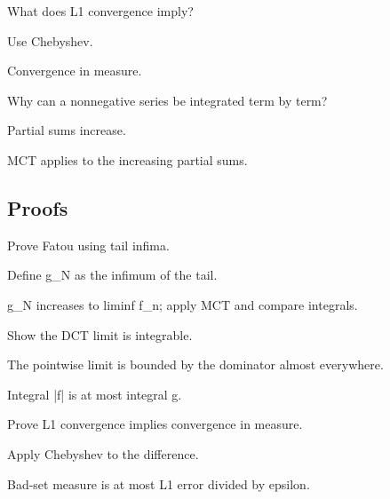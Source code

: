 \begin{exercise}[L1 to measure]\label{exr:iii04-expand-04}
What does L1 convergence imply?
\end{exercise}
\begin{hint}
Use Chebyshev.
\end{hint}
\begin{solution}
Convergence in measure.
\end{solution}

\begin{exercise}\label{exr:iii04-expand-05}
Why can a nonnegative series be integrated term by term?
\end{exercise}
\begin{hint}
Partial sums increase.
\end{hint}
\begin{solution}
MCT applies to the increasing partial sums.
\end{solution}

\subsection*{Proofs}

\begin{exercise}\label{exr:iii04-expand-06}
Prove Fatou using tail infima.
\end{exercise}
\begin{hint}
Define g\_N as the infimum of the tail.
\end{hint}
\begin{solution}
g\_N increases to liminf f\_n; apply MCT and compare integrals.
\end{solution}

\begin{exercise}\label{exr:iii04-expand-07}
Show the DCT limit is integrable.
\end{exercise}
\begin{hint}
The pointwise limit is bounded by the dominator almost everywhere.
\end{hint}
\begin{solution}
Integral |f| is at most integral g.
\end{solution}

\begin{exercise}\label{exr:iii04-expand-08}
Prove L1 convergence implies convergence in measure.
\end{exercise}
\begin{hint}
Apply Chebyshev to the difference.
\end{hint}
\begin{solution}
Bad-set measure is at most L1 error divided by epsilon.
\end{solution}

